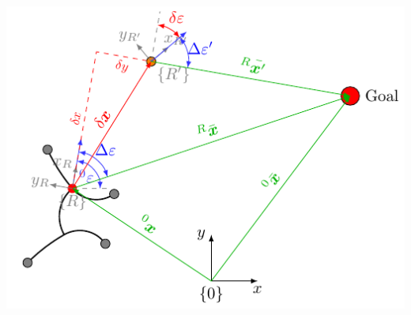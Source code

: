 \documentclass[10pt,a4paper]{article}
\begin{document}
\includegraphics[scale=1]{pics/general_model/model_cost.pdf}
\end{document}
